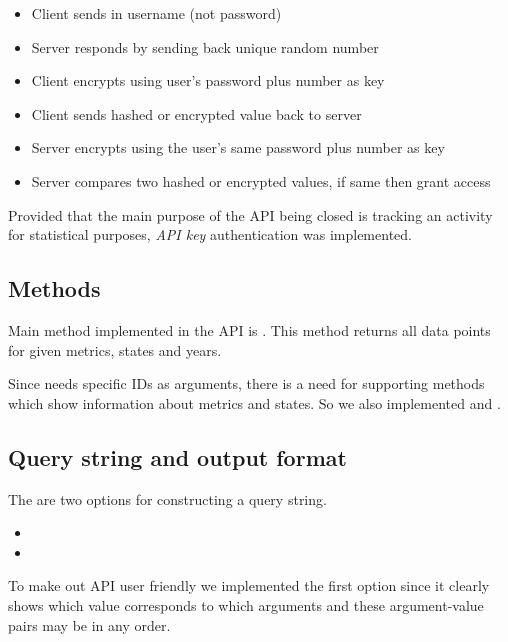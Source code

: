 				\begin{itemize}
					\item
						Client sends in username (not password)
					\item
						Server responds by sending back unique random number
					\item
						Client encrypts using user's password plus number as key
					\item
						Client sends hashed or encrypted value back to server
					\item
						Server encrypts using the user's same password plus number as key
					\item
						Server compares two hashed or encrypted values, if same then grant access
				\end{itemize}
				
				Provided that the main purpose of the API being closed is tracking an activity 
				for statistical purposes, \emph{API key} authentication was implemented.

			\subsection{Methods}
				
				Main method implemented in the API is . 
				This method returns all data points for given metrics, states and years.
				
				Since  needs specific IDs as arguments, there is a need for supporting 
				methods which show information about metrics and states. 
				So we also implemented  and .

			\subsection{Query string and output format}
			
				The are two options for constructing a query string.
				\begin{itemize}
					\item
					\item
				\end{itemize}
				
				To make out API user friendly we implemented the first option since it clearly 
				shows which value corresponds to which arguments and these argument-value pairs may be in any order.
				
